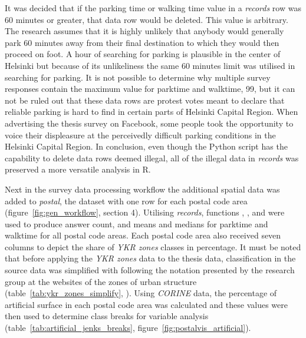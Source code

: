It was decided that if the parking time or walking time value in a \textit{records} row was 60 minutes or greater, that data row would be deleted. This value is arbitrary. The research assumes that it is highly unlikely that anybody would generally park 60 minutes away from their final destination to which they would then proceed on foot. A hour of searching for parking is plausible in the center of Helsinki but because of its unlikeliness the same 60 minutes limit was utilised in searching for parking. It is not possible to determine why multiple survey responses contain the maximum value for parktime and walktime, 99, but it can not be ruled out that these data rows are protest votes meant to declare that reliable parking is hard to find in certain parts of Helsinki Capital Region. When advertising the thesis survey on Facebook, some people took the opportunity to voice their displeasure at the perceivedly difficult parking conditions in the Helsinki Capital Region. In conclusion, even though the Python script has the capability to delete data rows deemed illegal, all of the illegal data in \textit{records} was preserved a more versatile analysis in R.

Next in the survey data processing workflow the additional spatial data was added to \textit{postal}, the dataset with one row for each postal code area (figure~\ref{fig:gen_workflow}, section 4). Utilising \textit{records}, functions , , and  were used to produce answer count, and means and medians for parktime and walktime for all postal code areas. Each postal code area also received seven columns to depict the share of \textit{YKR zones} classes in percentage. It must be noted that before applying the \textit{YKR zones} data to the thesis data, classification in the source data was simplified with following the notation presented by the research group at the websites of the zones of urban structure (table~\ref{tab:ykr_zones_simplify}, \cite{FinnishEnvironmentInstitute2013}). Using \textit{CORINE} data, the percentage of artificial surface in each postal code area was calculated and these values were then used to determine class breaks for variable analysis (table~\ref{tab:artificial_jenks_breaks}, figure~\ref{fig:postalvis_artificial}).

